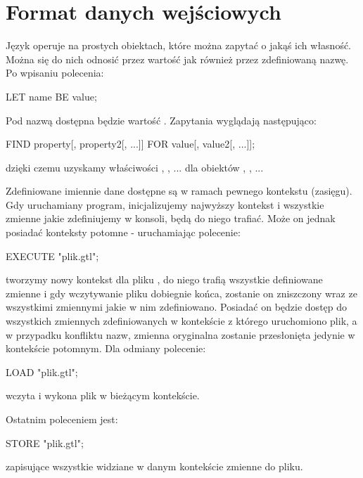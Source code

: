 \documentclass[polish]{standalone}
\begin{document}
\section{Format danych wejściowych \label{GTL}}

Język  operuje na prostych obiektach, które można zapytać o jakąś ich własność. Można się do nich odnosić przez
wartość jak również przez zdefiniowaną nazwę. Po wpisaniu polecenia:

\begin{code}
LET name BE value;
\end{code}

Pod nazwą  dostępna będzie wartość . Zapytania wyglądają następująco:

\begin{gtl}
FIND property[, property2[, ...]]
 FOR value[, value2[, ...]];
\end{gtl}

dzięki czemu uzyskamy właściwości , , ... dla obiektów , , ...

Zdefiniowane imiennie dane dostępne są w ramach pewnego kontekstu (zasięgu). Gdy uruchamiany program, inicjalizujemy 
najwyższy kontekst i wszystkie zmienne jakie zdefiniujemy w konsoli, będą do niego trafiać. Może on jednak posiadać
konteksty potomne - uruchamiając polecenie:

\begin{gtl}
EXECUTE "plik.gtl";
\end{gtl}

tworzymy nowy kontekst dla pliku , do niego trafią wszystkie definiowane zmienne i gdy wczytywanie pliku
dobiegnie końca, zostanie on zniszczony wraz ze wszystkimi zmiennymi jakie w nim zdefiniowano. Posiadać on będzie dostęp
do wszystkich zmiennych zdefiniowanych w kontekście z którego uruchomiono plik, a w przypadku konfliktu nazw, zmienna
oryginalna zostanie przesłonięta jedynie w kontekście potomnym. Dla odmiany polecenie:

\begin{gtl}
LOAD "plik.gtl";
\end{gtl}

wczyta i wykona plik w bieżącym kontekście.

Ostatnim poleceniem jest:

\begin{gtl}
STORE "plik.gtl";
\end{gtl}

zapisujące wszystkie widziane w danym kontekście zmienne do pliku.
\end{document}
